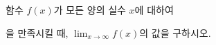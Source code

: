 함수 $f(x)$가 모든 양의 실수 $x$에 대하여 \par\smallskip{}\par\smallskip\noindent 을 만족시킬 때, $\displaystyle\lim_{x\to\infty}f(x)$의 값을 구하시오.
